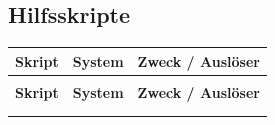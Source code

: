 \subsection{Hilfsskripte}
\begingroup
\begin{xltabular}{\linewidth}{@{} >{\ttfamily\RaggedRight}p{4.2cm} l >{\RaggedRight}X @{}}
\toprule
\textbf{\normalfont Skript} & \textbf{System} & \textbf{Zweck / Auslöser} \\
\midrule
\endfirsthead

 \\
\toprule
\textbf{\normalfont Skript} & \textbf{System} & \textbf{Zweck / Auslöser} \\
\midrule
\endhead

 \\
\endfoot

\endlastfoot


\end{xltabular}
